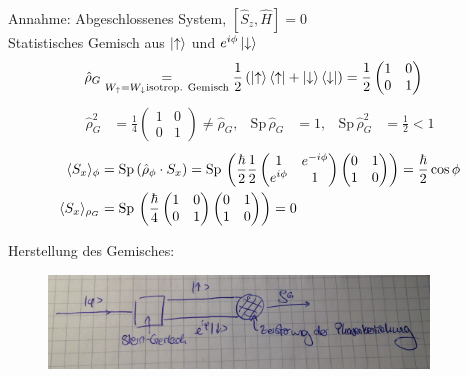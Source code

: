 	Annahme: Abgeschlossenes System, $[\hat{S}_z, \hat{H}] = 0$ \\
	Statistisches Gemisch aus $\ket{\uparrow}$ und $e^{i\phi} \ket{\downarrow}$ 
		\begin{align*}
			\hat{\rho}_G &\underset{W_\uparrow = W_\downarrow \text{isotrop. Gemisch}}{=} 
			\frac{1}{2} 
			\left(
				\ket{\uparrow} \bra{\uparrow} + \ket{\downarrow} \bra{\downarrow}
			\right) = 
			\frac{1}{2}
			\begin{pmatrix}
				1 & 0 \\
				0 & 1
			\end{pmatrix}
		\end{align*}
		\begin{align*}
			\hat{\rho}^2_G &= \frac{1}{4} 
			\begin{pmatrix}
				1 & 0 \\
				0 & 1 
			\end{pmatrix} \neq \hat{\rho}_G,&
			\mathrm{Sp}\, \hat{\rho}_G &= 1,&
			\mathrm{Sp}\, \hat{\rho}^2_G &= \frac{1}{2} <1 
		\end{align*}
		\begin{align*}
			\langle {S_x} \rangle_\phi &= \mathrm{Sp}\, (\hat{\rho}_\phi \cdot S_x) =
			\mathrm{Sp}\, \left(
				\frac{\hbar}{2} \frac{1}{2} 
				\begin{pmatrix}
					1 & e^{-i\phi} \\
					e^{i \phi} & 1 
				\end{pmatrix}
				\begin{pmatrix}
				0 & 1 \\
				1 & 0 
				\end{pmatrix}
			\right) = \frac{\hbar}{2} \cos \phi \\
			\langle {S_x} \rangle_{\rho_G} &= \mathrm{Sp}\,
			\left(
				\frac{\hbar}{4}
				\begin{pmatrix}
				1 & 0 \\
				0 & 1 
				\end{pmatrix}
				\begin{pmatrix}
				0 & 1 \\
				1 & 0 
				\end{pmatrix}
			\right) = 0
		\end{align*}
		
	Herstellung des Gemisches:

	\begin{figure} [h]
		\begin{center}
			\includegraphics[width=0.9\textwidth]{Statistische_Gemische_und_Dichtematrix3}
		\end{center}
	\end{figure}
	
